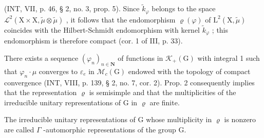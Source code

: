 (INT, VII, p. 46, § 2, no. 3, prop. 5). Since \(\widetilde{k}_{\varphi}\) belongs to the space \(\mathcal{L}^2 (\mathrm{X}\times \mathrm{X},\widetilde{\mu}\otimes \widetilde{\mu})\) , it follows that the endomorphism \(\varrho (\varphi)\) of \(\mathrm{L}^2 (\mathrm{X},\widetilde{\mu})\) coincides with the Hilbert-Schmidt endomorphism with kernel \(\widetilde{k}_{\varphi}\) ; this endomorphism is therefore compact (cor. 1 of III, p. 33).

There exists a sequence \((\varphi_{n})_{n\in\mathbf{N}}\) of functions in \(\mathcal{K}_{+}(\mathrm{G})\) with integral 1 such that \(\varphi_{n}\cdot\mu\) converges to \(\varepsilon_{e}\) in \(\mathcal{M}_{c}(\mathrm{G})\) endowed with the topology of compact convergence (INT, VIII, p. 139, § 2, no. 7, cor. 2). Prop. 2 consequently implies that the representation \(\varrho\) is semisimple and that the multiplicities of the irreducible unitary representations of G in \(\varrho\) are finite.

The irreducible unitary representations of G whose multiplicity in \(\varrho\) is nonzero are called \(\Gamma\) -automorphic representations of the group G.


